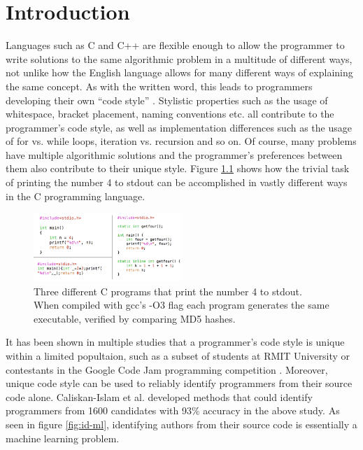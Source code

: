 \documentclass[a4paper,11pt]{kth-mag}
\begin{document}
\chapter{Introduction}
Languages such as C and C++ are flexible enough to allow the programmer to
write solutions to the same algorithmic problem in a multitude of different
ways, not unlike how the English language allows for many different ways of
explaining the same concept. As with the written word, this leads to
programmers developing their own ``code style''
\parencite{krsul1997authorship}. Stylistic properties such as the usage of
whitespace, bracket placement, naming conventions etc. all contribute to the
programmer's code style, as well as implementation differences such as the
usage of for vs. while loops, iteration vs. recursion and so on. Of course,
many problems have multiple algorithmic solutions and the programmer's
preferences between them also contribute to their unique style. Figure
\ref{fig:3x4} shows how the trivial task of printing the number 4 to stdout can
be accomplished in vastly different ways in the C programming language.


\begin{figure}[!htb]
    \centering
    \includegraphics[width=0.5\textwidth]{3x4}
    \caption{Three different C programs that print the number 4 to stdout. When
    compiled with gcc's -O3 flag each program generates the same executable,
    verified by comparing MD5 hashes.}
    \label{fig:3x4}
\end{figure}

It has been shown in multiple studies that a programmer's code style is unique
within a limited popultaion, such as a subset of students at RMIT University
\parencite{burrows2009application} or contestants in the Google Code Jam
programming competition \parencite{caliskan2015anonymizing}. Moreover, unique
code style can be used to reliably identify programmers from their source code
alone.  Caliskan-Islam et al. developed methods that could identify programmers
from 1600 candidates with 93\% accuracy in the above study. As seen in figure
\ref{fig:id-ml}, identifying authors from their source code is essentially a
machine learning problem.
\end{document}
